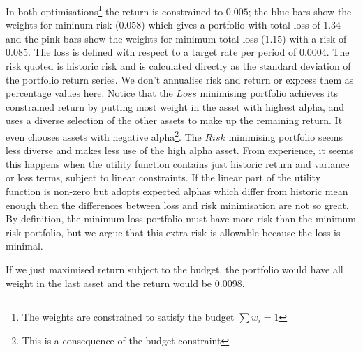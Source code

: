 \documentclass[12pt]{article}
\begin{document}
In both optimisations\footnote{The weights are constrained to satisfy the budget $\sum w_i = 1$} the return is 
constrained to $0.005$; the blue bars show the weights
for mininum risk ($0.058$) which gives a portfolio with total loss of $1.34$ and the pink bars show
the weights for minimum total loss ($1.15$) with a risk of $0.085$. The loss is defined with respect to a target rate per period of 
$0.0004$. The risk quoted is historic risk and is 
calculated directly as the standard deviation of the portfolio return series. We don't annualise risk and return or 
express them as percentage values here.
Notice that the $Loss$ minimising portfolio achieves its constrained return by putting most weight in the
asset with highest alpha, and uses a diverse selection of the other assets to make up the remaining 
return. It even chooses assets with negative alpha\footnote{This is a consequence of the budget constraint}. 
The $Risk$ minimising portfolio seems less diverse and makes less use of the high alpha asset.
From experience, it seems this happens when the utility function contains just historic return and variance or loss terms,
subject to linear constraints. If the linear part of the utility function is non-zero but adopts expected alphas which differ from historic mean 
enough then the differences between loss and risk minimisation are not so great.
By definition, the minimum loss 
portfolio must have more risk than the minimum risk portfolio, but we argue that this extra risk is allowable 
because the loss is minimal.

If we just maximised return subject to the budget, the portfolio would have all weight in the last 
asset and the return would be $0.0098$.
\end{document}
